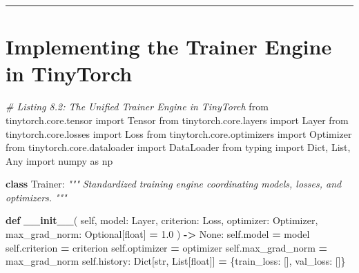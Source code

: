 \documentclass[
  letterpaper,
]{scrbook}
\newenvironment{Shaded}{\begin{snugshade}}{\end{snugshade}}
\newcommand{\BuiltInTok}[1]{#1}
\newcommand{\CommentTok}[1]{\textcolor[rgb]{0.56,0.35,0.01}{\textit{#1}}}
\newcommand{\FloatTok}[1]{\textcolor[rgb]{0.00,0.00,0.81}{#1}}
\newcommand{\FunctionTok}[1]{\textcolor[rgb]{0.13,0.29,0.53}{\textbf{#1}}}
\newcommand{\ImportTok}[1]{#1}
\newcommand{\KeywordTok}[1]{\textcolor[rgb]{0.13,0.29,0.53}{\textbf{#1}}}
\newcommand{\NormalTok}[1]{#1}
\newcommand{\OperatorTok}[1]{\textcolor[rgb]{0.81,0.36,0.00}{\textbf{#1}}}
\newcommand{\StringTok}[1]{\textcolor[rgb]{0.31,0.60,0.02}{#1}}
\newcommand{\VariableTok}[1]{\textcolor[rgb]{0.00,0.00,0.00}{#1}}
\begin{document}
\begin{center}\rule{0.5\linewidth}{0.5pt}\end{center}

\section{Implementing the Trainer Engine in
TinyTorch}\label{implementing-the-trainer-engine-in-tinytorch}

\begin{Shaded}
\begin{Highlighting}[]
\CommentTok{\# Listing 8.2: The Unified Trainer Engine in TinyTorch}
\ImportTok{from}\NormalTok{ tinytorch.core.tensor }\ImportTok{import}\NormalTok{ Tensor}
\ImportTok{from}\NormalTok{ tinytorch.core.layers }\ImportTok{import}\NormalTok{ Layer}
\ImportTok{from}\NormalTok{ tinytorch.core.losses }\ImportTok{import}\NormalTok{ Loss}
\ImportTok{from}\NormalTok{ tinytorch.core.optimizers }\ImportTok{import}\NormalTok{ Optimizer}
\ImportTok{from}\NormalTok{ tinytorch.core.dataloader }\ImportTok{import}\NormalTok{ DataLoader}
\ImportTok{from}\NormalTok{ typing }\ImportTok{import}\NormalTok{ Dict, List, Any}
\ImportTok{import}\NormalTok{ numpy }\ImportTok{as}\NormalTok{ np}

\KeywordTok{class}\NormalTok{ Trainer:}
    \CommentTok{"""}
\CommentTok{    Standardized training engine coordinating models, losses, and optimizers.}
\CommentTok{    """}

    \KeywordTok{def} \FunctionTok{\_\_init\_\_}\NormalTok{(}
        \VariableTok{self}\NormalTok{,}
\NormalTok{        model: Layer,}
\NormalTok{        criterion: Loss,}
\NormalTok{        optimizer: Optimizer,}
\NormalTok{        max\_grad\_norm: Optional[}\BuiltInTok{float}\NormalTok{] }\OperatorTok{=} \FloatTok{1.0}
\NormalTok{    ) }\OperatorTok{{-}\textgreater{}} \VariableTok{None}\NormalTok{:}
        \VariableTok{self}\NormalTok{.model }\OperatorTok{=}\NormalTok{ model}
        \VariableTok{self}\NormalTok{.criterion }\OperatorTok{=}\NormalTok{ criterion}
        \VariableTok{self}\NormalTok{.optimizer }\OperatorTok{=}\NormalTok{ optimizer}
        \VariableTok{self}\NormalTok{.max\_grad\_norm }\OperatorTok{=}\NormalTok{ max\_grad\_norm}
        \VariableTok{self}\NormalTok{.history: Dict[}\BuiltInTok{str}\NormalTok{, List[}\BuiltInTok{float}\NormalTok{]] }\OperatorTok{=}\NormalTok{ \{}\StringTok{\textquotesingle{}train\_loss\textquotesingle{}}\NormalTok{: [], }\StringTok{\textquotesingle{}val\_loss\textquotesingle{}}\NormalTok{: []\}}


\end{Highlighting}
\end{Shaded}
\end{document}
